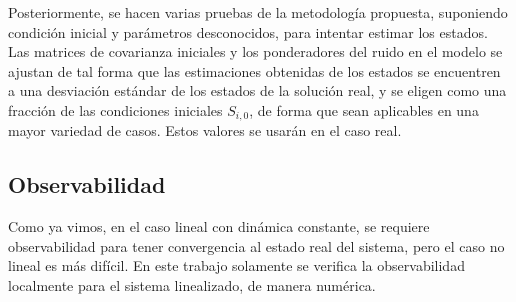 Posteriormente, se hacen varias pruebas de la metodología propuesta, suponiendo condición inicial y parámetros desconocidos, para intentar estimar los estados. Las matrices de covarianza iniciales y los ponderadores del ruido en el modelo se ajustan de tal forma que las estimaciones obtenidas de los estados se encuentren a una desviación estándar de los estados de la solución real, y se eligen como una fracción de las condiciones iniciales \(S_{i,0}\), de forma que sean aplicables en una mayor variedad de casos. Estos valores se usarán en el caso real.





\subsection{Observabilidad}\label{met-subsec:obs}

Como ya vimos, en el caso lineal con dinámica constante, se requiere observabilidad para tener convergencia al estado real del sistema, pero el caso no lineal es más difícil. En este trabajo solamente se verifica la observabilidad localmente para el sistema linealizado, de manera numérica. 




